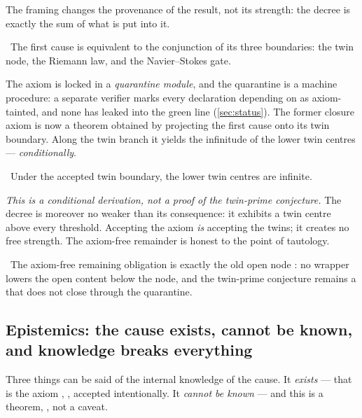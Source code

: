 The framing changes the provenance of the result, not its strength: the decree is exactly the sum of
what is put into it.

\begin{theorem}\label{thm:step00FirstCause_iff_causalClosure}
\green{}\ The first cause is equivalent to the conjunction of its three boundaries: the twin node,
the Riemann law, and the Navier--Stokes gate. 
\end{theorem}

The axiom is locked in a \emph{quarantine module}, and the quarantine is a machine procedure: a
separate verifier marks every declaration depending on \axiom{} as axiom-tainted, and none has leaked
into the green line (\cref{sec:status}). The former closure axiom is now a theorem obtained by
projecting the first cause onto its twin boundary. Along the twin branch it yields the infinitude of
the lower twin centres --- \emph{conditionally}.

\begin{theorem}\label{thm:twinLowersInfinite_from_step00CausalClosure}
\yellow{}\ Under the accepted twin boundary, the lower twin centres are infinite.
\end{theorem}

\emph{This is a conditional derivation, not a proof of the twin-prime conjecture.} The decree is
moreover no weaker than its consequence: it exhibits a twin centre above every threshold. Accepting
the axiom \emph{is} accepting the twins; it creates no free strength. The axiom-free remainder is
honest to the point of tautology.

\begin{theorem}\label{thm:nonAxiomaticRemainingObligation_iff_lastStep00Obligation}
\green{}\ The axiom-free remaining obligation is exactly the old open node \red{}: no wrapper lowers
the open content below the node, and the twin-prime conjecture remains a  that does not
close through the quarantine. 
\end{theorem}

\subsection{Epistemics: the cause exists, cannot be known, and knowledge breaks everything}

Three things can be said of the internal knowledge of the cause. It \emph{exists} --- that is the
axiom \axiom{}, \yellow{}, accepted intentionally. It \emph{cannot be known} --- and this is a
theorem, \green{}, not a caveat.

